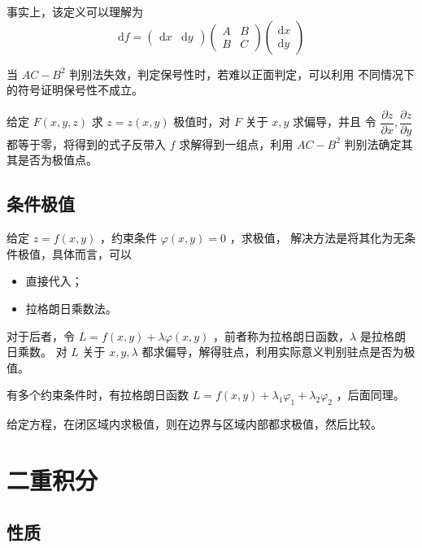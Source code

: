 事实上，该定义可以理解为$$
    \mathrm{d}f = \begin{pmatrix}
        \mathrm{d}x & \mathrm{d}y
    \end{pmatrix}\begin{pmatrix}
        A&B\\B&C
    \end{pmatrix}\begin{pmatrix}
        \mathrm{d}x\\\mathrm{d}y
    \end{pmatrix}
$$ 

当 $ AC-B^2 $ 判别法失效，判定保号性时，若难以正面判定，可以利用
不同情况下的符号证明保号性不成立。

给定 $ F(x,y,z) $ 求 $ z = z(x,y) $ 极值时，对 $ F $ 关于 $ x,y $ 求偏导，并且
令 $ \dfrac{\partial z}{\partial x},\dfrac{\partial z}{\partial y} $ 
都等于零，将得到的式子反带入 $ f $ 求解得到一组点，利用 $ AC-B^2 $ 判别法确定其
其是否为极值点。

\subsection{条件极值}

给定 $ z = f(x,y) $ ，约束条件 $ \varphi(x,y) = 0 $ ，求极值，
解决方法是将其化为无条件极值，具体而言，可以
\begin{itemize}
    \item 直接代入；
    \item 拉格朗日乘数法。
\end{itemize}

对于后者，令 $ L = f(x,y) + \lambda\varphi(x,y) $ ，前者称为拉格朗日函数，$ \lambda $ 是拉格朗日乘数。
对 $ L $ 关于 $ x,y,\lambda $ 都求偏导，解得驻点，利用实际意义判别驻点是否为极值。

有多个约束条件时，有拉格朗日函数 $ L = f(x,y) + \lambda_1\varphi_1 + \lambda_2\varphi_2 $ ，后面同理。

给定方程，在闭区域内求极值，则在边界与区域内部都求极值，然后比较。

\section{二重积分}

\subsection{性质}

